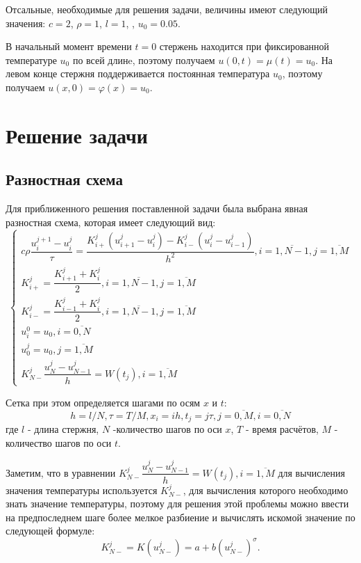 \documentclass[a4paper,12pt]{report}
\begin{document}
Отсальные, необходимые для решения задачи, величины имеют следующий значения:
$c=2$, $\rho = 1$,  $l = 1$, , $u_{0} = 0.05$.

В начальный момент времени $t = 0$ стержень находится при фиксированной температуре $u_{0}$ по всей длинe,
поэтому получаем $u(0, t) = \mu (t) = u_{0}$. На левом конце стержня поддерживается постоянная температура 
$u_{0}$, поэтому получаем $u(x, 0) = \varphi (x) = u_{0}$.

\chapter{Решение задачи}
\section{Разностная схема}
Для приближенного решения поставленной задачи была выбрана явная разностная схема,
которая имеет следующий вид:
\begin{displaymath}
	\left\{
		\begin{array}{l}
			c \rho \dfrac{u_{i}^{j+1} - u_{i}^{j}}{\tau}=\dfrac{K_{i+}^{j}(u_{i+1}^{j} - u_{i}^{j}) - K_{i-}^{j}(u_{i}^{j} - u_{i-1}^{j})}{h^{2}}, i = \overline{1, N-1}, j = \overline{1, M} \\
			K_{i+}^{j} =  \dfrac{K_{i+1}^{j} + K_{i}^{j}}{2}, i = \overline{1, N-1}, j = \overline{1, M}  \\
			K_{i-}^{j} =  \dfrac{K_{i-1}^{j} + K_{i}^{j}}{2}, i = \overline{1, N-1}, j = \overline{1, M}  \\
			u_{i}^{0} =  u_{0}, i = \overline{0, N}  \\
			u_{0}^{j} =  u_{0}, j = \overline{1, M}  \\
			K_{N-}^{j} \dfrac{u_{N}^{j} - u_{N-1}^{j}}{h} = W(t_{j}), i = \overline{1, M}
		\end{array} \right.
\end{displaymath}

Сетка при этом определяется шагами по осям $x$ и $t$:
\begin{equation}
	h = l/N,
	\tau = T/M,
	x_{i} = ih, 
	t_{j} = j\tau, 
	j = \overline{0, M},
	i = \overline{0, N}
\end{equation}
где $l$ - длина стержня, $N$ -количество шагов по оси $x$, $T$ - время расчётов,
$M$ - количество шагов по оси  $t$.

Заметим, что в уравнении $K_{N-}^{j} \dfrac{u_{N}^{j} - u_{N-1}^{j}}{h} = W(t_{j}), i = \overline{1, M}$ для вычисления значения температуры используется 
$K_{N-}^{j}$, для вычисления которого необходимо знать значение температуры,
поэтому для решения этой проблемы можно ввести на предпоследнем шаге более мелкое разбиение и вычислять искомой значение по следующей формуле:
\begin{equation}
	K_{N-}^{j} = K(u_{N-}^{j}) = a + b(u_{N-}^{j})^{\sigma}.
\end{equation}
\end{document}
